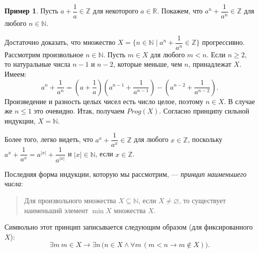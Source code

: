\documentclass[12pt,notitlepage]{article}
\theoremstyle{plain}
\theoremstyle{definition}
\newtheorem{exm}[thm]{Пример}
\theoremstyle{plain}
\newcommand{\N}{\mathbb{N}}
\newcommand{\sbs}{\subseteq}
\newcommand{\void}{\varnothing}
\newcommand{\1}{\mathbf{1}}
\newcommand{\0}{\mathbf{0}}
\newcommand{\mcomm}[1]{}
\begin{document}
\begin{exm}
	Пусть $a + \dfrac{1}{a} \in \mathbb{Z}$ для некоторого $a \in \mathbb{R}$. Покажем, что $a^n + \dfrac{1}{a^n} \in \mathbb{Z}$ для любого $n \in \N$.
	
	Достаточно доказать, что множество $X = \{n \in \N \mid a^n + \dfrac{1}{a^n} \in \mathbb{Z}\}$ прогрессивно. Рассмотрим произвольное $n \in \N$. Пусть $m \in X$ для любого $m < n$. Если $n \geq 2$, то натуральные числа $n - 1$ и $n - 2$, которые меньше, чем $n$, принадлежат $X$. Имеем:
	$$a^n + \dfrac{1}{a^n} = \left (a + \dfrac{1}{a}\right)\left (a^{n-1} + \dfrac{1}{a^{n-1}} \right) - \left (a^{n-2} + \dfrac{1}{a^{n-2}} \right).$$
	Произведение и разность целых чисел есть число целое, поэтому $n \in X$. В случае же $n \leq 1$ это очевидно. Итак, получаем $Prog(X)$. Согласно принципу сильной индукции, $X = \N$.
	
	Более того, легко видеть, что $a^x + \dfrac{1}{a^x} \in \mathbb{Z}$ для любого $x \in \mathbb{Z}$, поскольку $a^x + \dfrac{1}{a^x} = a^{|x|} + \dfrac{1}{a^{|x|}}$ и $|x| \in \N$, если $x \in \mathbb{Z}$.
\end{exm}

Последняя форма индукции, которую мы рассмотрим, --- \emph{принцип наименьшего числа}:
\begin{quote}
	Для произвольного множества $X \sbs \N$, если $X \neq \void$, то существует наименьший элемент $\min X$ множества $X$.
\end{quote}
Символьно этот принцип записывается следующим образом (для фиксированного $X$):
$$\exists m\  m \in X \to \exists n\, \bigl(n \in X \wedge \forall m\, (m < n \to  m \notin X)\bigr).$$
\mcomm{As we have stated it, this is a `\emph{minimal} element principle' despite its traditional name. Although, for the linear ordering of $\N$, the choice between `minimal' and `least' does not logically matter, just the `minimal' form is equivalent to `strong' (or transfinite) induction for an arbitrary poset. Therefore we prefer to keep the traditional name for this general form of the principle. On the other hand, students may have questions on this ``misleading'' name when they have learned about minima and maxima in posets. The notation $\min X$ will be redefined later as well.}
\end{document}
